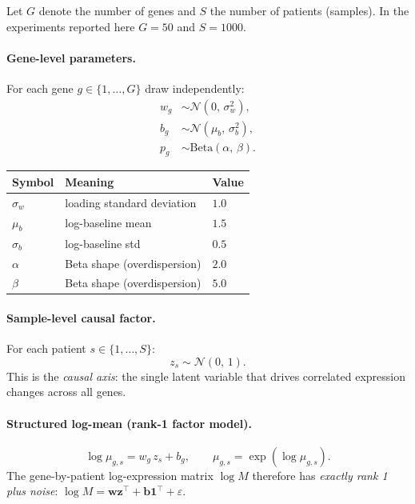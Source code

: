\documentclass[11pt,a4paper]{article}
\newcommand{\N}{\mathcal{N}}
\newcommand{\Beta}{\mathrm{Beta}}
\theoremstyle{definition}
\begin{document}
Let $G$ denote the number of genes and $S$ the number of patients
(samples). In the experiments reported here $G = 50$ and $S = 1000$.

\paragraph{Gene-level parameters.}
For each gene $g \in \{1,\ldots,G\}$ draw independently:
\begin{align}
  w_g   &\sim \N(0,\, \sigma_w^2), \label{eq:w_prior}\\
  b_g   &\sim \N(\mu_b,\, \sigma_b^2), \label{eq:b_prior}\\
  p_g   &\sim \Beta(\alpha,\, \beta). \label{eq:p_prior}
\end{align}
\begin{center}
\begin{tabular}{lll}
\toprule
Symbol & Meaning & Value\\
\midrule
$\sigma_w$ & loading standard deviation & $1.0$\\
$\mu_b$    & log-baseline mean           & $1.5$\\
$\sigma_b$ & log-baseline std            & $0.5$\\
$\alpha$   & Beta shape (overdispersion) & $2.0$\\
$\beta$    & Beta shape (overdispersion) & $5.0$\\
\bottomrule
\end{tabular}
\end{center}

\paragraph{Sample-level causal factor.}
For each patient $s \in \{1,\ldots,S\}$:
\begin{equation}
  z_s \sim \N(0,\,1). \label{eq:z_prior}
\end{equation}
This is the \emph{causal axis}: the single latent variable that drives
correlated expression changes across all genes.

\paragraph{Structured log-mean (rank-1 factor model).}
\begin{equation}
  \log \mu_{g,s} = w_g \, z_s + b_g,
  \qquad
  \mu_{g,s} = \exp(\log \mu_{g,s}).
  \label{eq:logmu}
\end{equation}
The gene-by-patient log-expression matrix $\log M$ therefore has
\emph{exactly rank 1 plus noise}: $\log M = \bm{w}\bm{z}^\top +
\bm{b}\bm{1}^\top + \varepsilon$.
\end{document}

